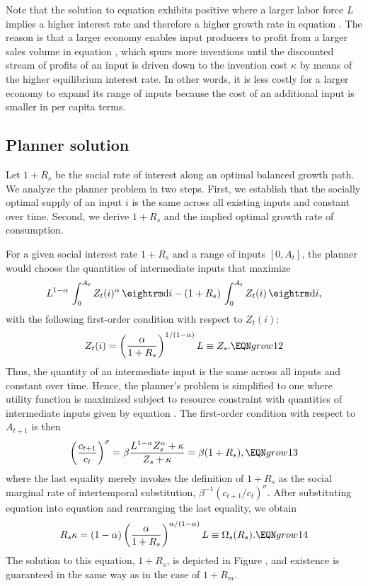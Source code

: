 \medskip

Note that the solution to equation  exhibits positive
 where a larger labor force $L$ implies a higher
interest rate and therefore a higher growth rate in equation
. The reason is that a larger economy enables input
producers to profit from a larger sales volume in equation ,
which spurs more inventions until the discounted stream of profits
of an input is driven down to the invention cost $\kappa$ by means of
the higher equilibrium interest rate. In other words, it is less
costly for a larger economy to expand its range of inputs because
the cost of an additional input is smaller in per capita terms.

\subsection{Planner solution}
Let $1+R_s$ be the social rate of interest along an optimal balanced
growth path. We analyze the planner problem in two steps.
First, we establish that the socially optimal supply of an input $i$ is
the same across all existing inputs and constant over time.
Second, we derive $1+R_s$ and the implied optimal growth rate of
consumption.

For a given social interest rate $1+R_s$ and a range of inputs $[0,A_t]$,
the planner would choose the quantities of intermediate inputs that
maximize
$$
L^{1-\alpha} \, \int_{0}^{A_t} Z_{t}(i)^\alpha \, {\rm d}i
- (1+R_s) \,  \int_{0}^{A_t} Z_{t}(i) \, {\rm d}i,
$$
with the following first-order condition with respect to $Z_t(i)$:
$$
Z_t(i) = \left( {\alpha \over 1+R_s} \right)^{1/(1-\alpha)} L \equiv Z_s.
                                                       \EQN grow12
$$
Thus, the quantity of an intermediate input is the same across all
inputs and constant over time. Hence, the planner's problem is
simplified to one where utility function 
is maximized subject to resource constraint  with quantities
of intermediate inputs given by equation . The first-order
condition with respect to $A_{t+1}$ is then
$$
\left({c_{t+1} \over c_t}\right)^\sigma =
          \beta { L^{1-\alpha} Z_s^\alpha + \kappa
          \over Z_s + \kappa } = \beta (1+R_s),            \EQN grow13
$$
where the last equality merely invokes the definition of $1+R_s$
as the social marginal rate of
intertemporal substitution,  $\beta^{-1}(c_{t+1}/c_t)^\sigma$.
After substituting equation
 into equation  and rearranging the
last equality, we obtain
$$
R_s \kappa = (1-\alpha)
\left( {\alpha \over 1+R_s} \right)^{\alpha /(1-\alpha)} L \equiv \Omega_s(R_s) .
                                                            \EQN grow14
$$
The solution to this equation, $1+R_s$, is depicted in Figure , and
existence is guaranteed in the same way as in the case of $1+R_m$.

